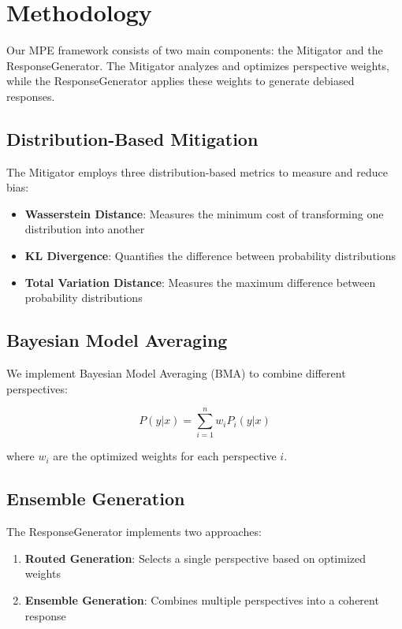 \section{Methodology}


Our MPE framework consists of two main components: the Mitigator and the ResponseGenerator. The Mitigator analyzes and optimizes perspective weights, while the ResponseGenerator applies these weights to generate debiased responses. 



\subsection{Distribution-Based Mitigation}
The Mitigator employs three distribution-based metrics to measure and reduce bias:

\begin{itemize}
    \item \textbf{Wasserstein Distance}: Measures the minimum cost of transforming one distribution into another
    \item \textbf{KL Divergence}: Quantifies the difference between probability distributions
    \item \textbf{Total Variation Distance}: Measures the maximum difference between probability distributions
\end{itemize}

\subsection{Bayesian Model Averaging}
We implement Bayesian Model Averaging (BMA) to combine different perspectives:

\begin{equation}
    P(y|x) = \sum_{i=1}^{n} w_i P_i(y|x)
\end{equation}

where $w_i$ are the optimized weights for each perspective $i$.

\subsection{Ensemble Generation}
The ResponseGenerator implements two approaches:

\begin{enumerate}
    \item \textbf{Routed Generation}: Selects a single perspective based on optimized weights
    \item \textbf{Ensemble Generation}: Combines multiple perspectives into a coherent response
\end{enumerate}

